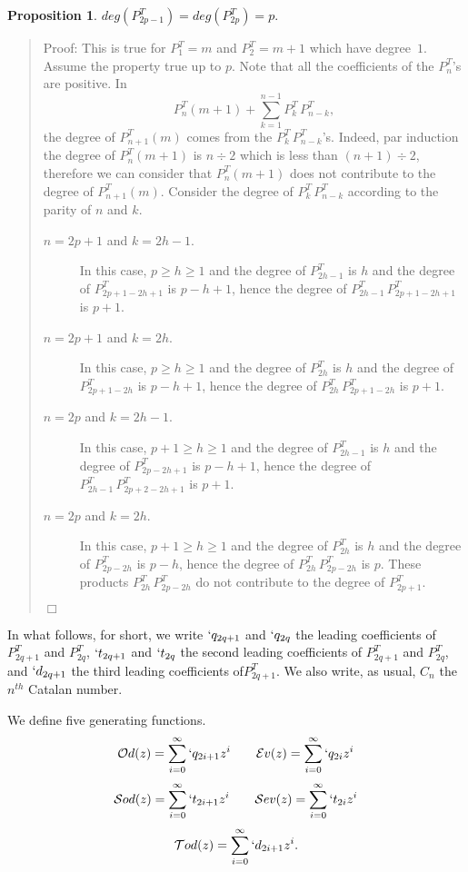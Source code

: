 \documentclass[preprint,authoryear]{elsarticle}
\newenvironment{proof}[1]{\begin{quotation}\noindent\textsf{Proof:} #1}{\(\Box\)\end{quotation}}
\newtheorem{prop}{Proposition}
\newcommand{\Od}{\mathcal{O}d}
\newcommand{\Sod}{\mathcal{S}od}
\newcommand{\Tod}{\mathcal{T}od}
\newcommand{\Ev}{\mathcal{E}v}
\newcommand{\Sev}{\mathcal{S}ev}
\begin{document}
\begin{prop}\label{prop:deg}
$deg(P^T_{2p-1}) = deg(P^T_{2p}) = p.$
\end{prop}
\begin{proof}{}
  This is true for $P^T_1 = m$ and $P^T_2 = m+1$ which have degree~$1$.  Assume the
  property true up to $p$.  Note that all the coefficients of the $P_n^T$'s are positive. In
\[P^T_{n}(m+1) + \sum_{k=1}^{n-1} P^T_{k}\, P^T_{n-k},\] the degree of $P^T_{n+1}(m)$ comes
from the $ P^T_{k}\, P^T_{n-k}$'s.  Indeed, par induction the degree of $P_n^T(m+1)$ is
$n\div 2$ which is less than $(n+1)\div 2$, therefore we can consider that $P_n^T(m+1)$
does not contribute to the degree of $P^T_{n+1}(m)$. 
Consider the degree of $ P^T_{k}\, P^T_{n-k}$
according to the parity of $n$ and $k$.
\begin{description}
\item[$n=2p+1$ and $k=2h-1$.]  In this case, $p\ge h\ge 1$ and the degree of $P^T_{2h-1}$ is $h$ and the
  degree of $P^T_{2p+1-2h +1}$ is $p-h+1$, hence the degree of $ P^T_{2h-1}\,
  P^T_{2p+1-2h+1}$ is $p+1$.
\item[$n=2p+1$ and $k=2h$.] In this case, $p\ge h \ge 1$ and the degree of $P^T_{2h}$ is $h$ and the
  degree of $P^T_{2p+1-2h}$ is $p-h+1$, hence the degree of $ P^T_{2h}\,
  P^T_{2p+1-2h}$ is $p+1$.
\item[$n=2p$ and $k=2h-1$.] In this case, $p+1\ge h \ge 1$ and the degree of
  $P^T_{2h-1}$ is $h$ and the degree of $P^T_{2p-2h +1}$ is $p-h+1$, hence the degree
  of $ P^T_{2h-1}\, P^T_{2p+2-2h+1}$ is $p+1$.
\item[$n=2p$ and $k=2h$.] In this case, $p+1\ge h \ge 1$ and the degree of
  $P^T_{2h}$ is $h$ and the degree of $P^T_{2p-2h}$ is $p-h$, hence the degree
  of $ P^T_{2h}\, P^T_{2p-2h}$ is $p$.  These products $ P^T_{2h}\, P^T_{2p-2h}$  do not
  contribute to the degree of $ P^T_{2p+1}$.
\end{description}

\end{proof}
In what follows, for short, we write $`q_{2q+1}$ and $`q_{2q}$ the leading coefficients of
$P^T_{2q+1}$ and $P^T_{2q}$, $`t_{2q+1}$ and $`t_{2q}$ the second leading coefficients of
$P^T_{2q+1}$ and $P^T_{2q}$, and $`d_{2q+1}$ the third leading coefficients
of$P^T_{2q+1}$.  We also write, as usual, $C_n$ the $n^{th}$ Catalan number.

We define five generating functions.
\begin{displaymath}
  \Od(z) = \sum_{i=0}^{\infty} `q_{2i+1} z^i \qquad
  \Ev(z) = \sum_{i=0}^{\infty} `q_{2i} z^i
 \end{displaymath}
  \begin{displaymath}
   \Sod(z) = \sum_{i=0}^{\infty} `t_{2i+1}z^i  \qquad
    \Sev(z) = \sum_{i=0}^{\infty}`t_{2i}z^i
  \end{displaymath}
  \begin{displaymath}
\Tod(z) = \sum_{i=0}^{\infty} `d_{2i+1}z^i.
\end{displaymath}
\end{document}
